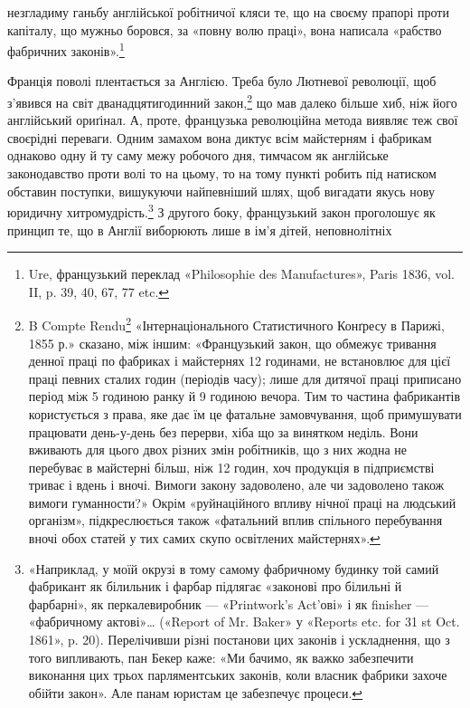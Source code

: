 \parcont{}  %
незгладиму ганьбу англійської робітничої кляси те, що на своєму
прапорі проти капіталу, що мужньо боровся, за «повну волю
праці», вона написала «рабство фабричних законів».\footnote{
Ure, французький переклад «Philosophie des Manufactures», Paris
1836, vol. II, p. 39, 40, 67, 77 etc.
}

Франція поволі плентається за Англією. Треба було Лютневої
революції, щоб з’явився на світ дванадцятигодинний закон,\footnote{
B Compte Rendu\footnote*{
— звіті. \emph{Ред.}
} «Інтернаціонального Статистичного Конґресу
в Парижі, 1855 р.» сказано, між іншим: «Французький закон,
що обмежує тривання денної праці по фабриках і майстернях 12 годинами,
не встановлює для цієї праці певних сталих годин (періодів часу); лише
для дитячої праці приписано період між 5 годиною ранку й 9 годиною вечора.
Тим то частина фабрикантів користується з права, яке дає їм
це фатальне замовчування, щоб примушувати працювати день-у-день
без перерви, хіба що за винятком неділь. Вони вживають для цього двох
різних змін робітників, що з них жодна не перебуває в майстерні більш,
ніж 12 годин, хоч продукція в підприємстві триває і вдень і вночі. Вимоги
закону задоволено, але чи задоволено також вимоги гуманности?» Окрім
«руйнаційного впливу нічної праці на людський організм», підкреслюється
також «фатальний вплив спільного перебування вночі обох статей
у тих самих скупо освітлених майстернях».
}
що мав далеко більше хиб, ніж його англійський ориґінал. А, проте,
французька революційна метода виявляє теж свої своєрідні
переваги. Одним замахом вона диктує всім майстерням і фабрикам
однаково одну й ту саму межу робочого дня, тимчасом як
англійське законодавство проти волі то на цьому, то на тому
пункті робить під натиском обставин поступки, вишукуючи найпевніший
шлях, щоб вигадати якусь нову юридичну хитромудрість.\footnote{
«Наприклад, у моїй окрузі в тому самому фабричному будинку
той самий фабрикант як білильник і фарбар підлягає «законові про білильні
й фарбарні», як перкалевиробник — «Printwork’s Act’ові» і як finisher —
«фабричному актові»\dots{} («Report of Mr. Baker» у «Reports etc. for 31 st
Oct. 1861», p. 20). Перелічивши різні постанови цих законів і ускладнення,
що з того випливають, пан Бекер каже: «Ми бачимо, як важко забезпечити
виконання цих трьох парляментських законів, коли власник фабрики
захоче обійти закон». Але панам юристам це забезпечує процеси.
}
З другого боку, французький закон проголошує як
принцип те, що в Англії виборюють лише в ім’я дітей, неповнолітніх
